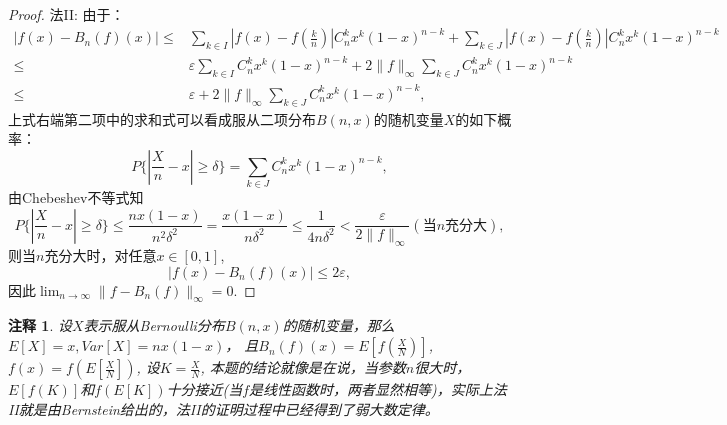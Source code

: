 \documentclass[a4paper,8pt]{ctexart}\textwidth 140mm \textheight 216mm
\newtheorem{Remark}{注释}[section]
\newcommand{\e}{\varepsilon}
\newcommand{\8}{\infty}
\begin{document}
\begin{proof}
	法II: 由于：
	\begin{equation*}
	\begin{split}
	|f(x)-B_n(f)(x)|\leq&\sum_{k\in I}\left|f(x)-f\left(\frac{k}{n}\right)\right|C_n^kx^k(1-x)^{n-k}+\sum_{k\in J}\left|f(x)-f\left(\frac{k}{n}\right)\right|C_n^kx^k(1-x)^{n-k}\\
	\leq &\e\sum_{k\in I}C_n^kx^k(1-x)^{n-k}+2\|f\|_\infty\sum_{k\in J}C_n^kx^k(1-x)^{n-k}\\
	\leq&\e+2\|f\|_\infty\sum_{k\in J}C_n^kx^k(1-x)^{n-k},
	\end{split}
	\end{equation*}
	上式右端第二项中的求和式可以看成服从二项分布$B(n,x)$的随机变量$X$的如下概率：
	\begin{equation*}
		P\{|\frac{X}{n}-x|\geq \delta\}=\sum_{k\in J}C_n^kx^k(1-x)^{n-k},
	\end{equation*}
	由Chebeshev不等式知
	\begin{equation*}
		P\{|\frac{X}{n}-x|\geq \delta\}\leq\frac{nx(1-x)}{n^2\delta^2}=\frac{x(1-x)}{n\delta^2}\leq\frac{1}{4n\delta^2}<\frac{\e}{2\|f\|_\infty}(当n\mbox{充分大}),
	\end{equation*}
	则当$n$充分大时，对任意$x\in[0,1]$, 
	$$|f(x)-B_n(f)(x)|\leq 2\e,$$
	因此$\lim_{n\to\infty}\|f-B_n(f)\|_\infty=0$.
\end{proof}
\begin{Remark}
	设$X$表示服从Bernoulli分布$B(n,x)$的随机变量，那么$E[X]=x,Var[X]=nx(1-x)$， 且$B_n(f)(x)=E[f(\frac{X}{N})]$, $f(x)=f(E[\frac{X}{N}])$, 设$K=\frac{X}{N}$, 本题的结论就像是在说，当参数$n$很大时，$E[f(K)]$和$f(E[K])$十分接近(当$f$是线性函数时，两者显然相等)，实际上法II就是由Bernstein给出的，法II的证明过程中已经得到了弱大数定律。
\end{Remark}
\end{document}
